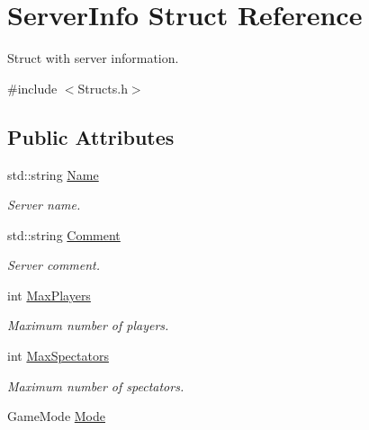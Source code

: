 \hypertarget{structServerInfo}{\section{Server\-Info Struct Reference}
\label{structServerInfo}
}


Struct with server information.  




{\ttfamily \#include $<$Structs.\-h$>$}

\subsection*{Public Attributes}
\begin{DoxyCompactItemize}
\item 
\hypertarget{structServerInfo_a43d5f6ee5b5e1886161cea865ac9f590}{std\-::string \hyperlink{structServerInfo_a43d5f6ee5b5e1886161cea865ac9f590}{Name}}\label{structServerInfo_a43d5f6ee5b5e1886161cea865ac9f590}

\begin{DoxyCompactList}\small\item\em Server name. \end{DoxyCompactList}\item 
\hypertarget{structServerInfo_a82d5babd55b867eca9f58e5ed32857c1}{std\-::string \hyperlink{structServerInfo_a82d5babd55b867eca9f58e5ed32857c1}{Comment}}\label{structServerInfo_a82d5babd55b867eca9f58e5ed32857c1}

\begin{DoxyCompactList}\small\item\em Server comment. \end{DoxyCompactList}\item 
\hypertarget{structServerInfo_a43e90d8209ae6481ded2f6974aa5b15a}{int \hyperlink{structServerInfo_a43e90d8209ae6481ded2f6974aa5b15a}{Max\-Players}}\label{structServerInfo_a43e90d8209ae6481ded2f6974aa5b15a}

\begin{DoxyCompactList}\small\item\em Maximum number of players. \end{DoxyCompactList}\item 
\hypertarget{structServerInfo_a4e766753bc57c2d13d5bd3a007707178}{int \hyperlink{structServerInfo_a4e766753bc57c2d13d5bd3a007707178}{Max\-Spectators}}\label{structServerInfo_a4e766753bc57c2d13d5bd3a007707178}

\begin{DoxyCompactList}\small\item\em Maximum number of spectators. \end{DoxyCompactList}\item 
\hypertarget{structServerInfo_ab37ce1284acdc55df878d382323863d3}{Game\-Mode \hyperlink{structServerInfo_ab37ce1284acdc55df878d382323863d3}{Mode}}\label{structServerInfo_ab37ce1284acdc55df878d382323863d3}


\end{DoxyCompactItemize}
